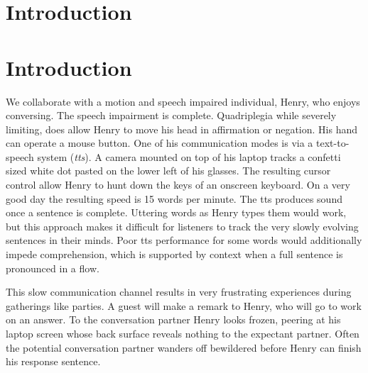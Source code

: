 \documentclass{sigchi}
\begin{document}




\newcommand{\py}{{\em coding interface}}
\newcommand{\puppet}{{\em Puppet interface}}
\newcommand{\semi}{{\em semi-autonomous interface}}
\newcommand{\tapper}{{\em Tapper}}



\section{Introduction}

%

\section{Introduction}
We collaborate with a motion and speech impaired individual, Henry,
who enjoys conversing. The speech impairment is complete. Quadriplegia
while severely limiting, does allow Henry to move his head in
affirmation or negation. His hand can operate a mouse button. One of
his communication modes is via a text-to-speech system ({\em tts}). A
camera mounted on top of his laptop tracks a confetti sized white dot
pasted on the lower left of his glasses. The resulting cursor control
allow Henry to hunt down the keys of an onscreen keyboard. On a very
good day the resulting speed is 15 words per minute. The tts produces
sound once a sentence is complete. Uttering words as Henry types them
would work, but this approach makes it difficult for listeners to
track the very slowly evolving sentences in their minds. Poor
tts performance for some words would additionally impede
comprehension, which is supported by context when a full sentence is
pronounced in a flow. 

This slow communication channel results in very frustrating
experiences during gatherings like parties. A guest will make a remark
to Henry, who will go to work on an answer. To the conversation
partner Henry looks frozen, peering at his laptop screen whose back
surface reveals nothing to the expectant partner. Often the potential
conversation partner wanders off bewildered before Henry can finish
his response sentence.
\end{document}
